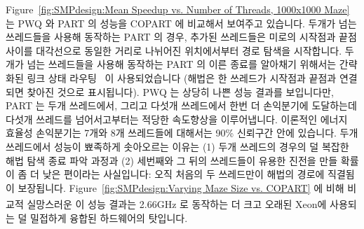 Figure~\ref{fig:SMPdesign:Mean Speedup vs. Number of Threads, 1000x1000 Maze}
는 PWQ 와 PART 의 성능을 COPART 에 비교해서 보여주고 있습니다.
두개가 넘는 쓰레드들을 사용해 동작하는 PART 의 경우, 추가된 쓰레드들은 미로의
시작점과 끝점 사이를 대각선으로 동일한 거리로 나뉘어진 위치에서부터 경로 탐색을
시작합니다.
두개가 넘는 쓰레드들을 사용해 동작하는 PART 의 이른 종료를 알아채기 위해서는
간략화된 링크 상태 라우팅~\cite{BERT-87} 이 사용되었습니다 (해법은 한 쓰레드가
시작점과 끝점과 연결되면 찾아진 것으로 표시됩니다).
PWQ 는 상당히 나쁜 성능 결과를 보입니다만, PART 는 두개 쓰레드에서, 그리고
다섯개 쓰레드에서 한번 더 손익분기에 도달하는데 다섯개 쓰레드를 넘어서고부터는
적당한 속도향상을 이루어냅니다.
이론적인 에너지 효율성 손익분기는 7개와 8개 쓰레드들에 대해서는 90\% 신뢰구간
안에 있습니다.
두개 쓰레드에서 성능이 뾰족하게 솟아오르는 이유는 (1) 두개 쓰레드의 경우의 덜
복잡한 해법 탐색 종료 파악 과정과 (2) 세번째와 그 뒤의 쓰레드들이 유용한 진전을
만들 확률이 좀 더 낮은 편이라는 사실입니다: 오직 처음의 두 쓰레드만이 해법의
경로에 직결됨이 보장됩니다.
Figure~\ref{fig:SMPdesign:Varying Maze Size vs. COPART} 에 비해 비교적
실망스러운 이 성능 결과는 2.66GHz 로 동작하는 더 크고 오래된
Xeon\textsuperscript\textregistered 에 사용되는 덜 밀접하게 융합된 하드웨어의
탓입니다.

